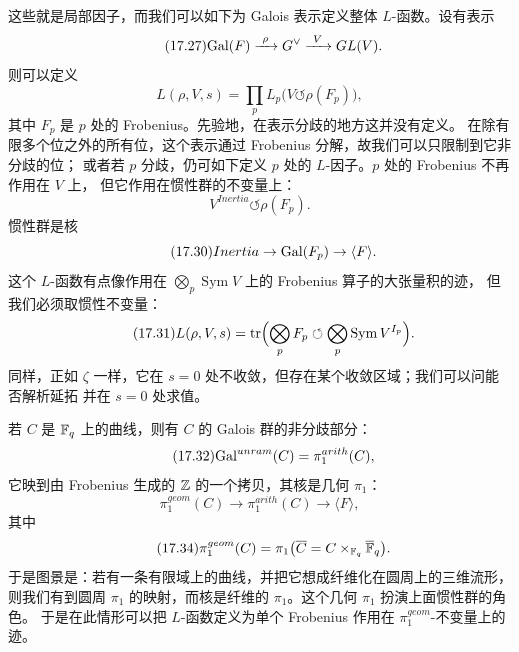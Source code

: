 这些就是局部因子，而我们可以如下为 Galois 表示定义整体 $L$-函数。设有表示
\begin{equation}\tag{17.27}\label{eq:17.27}
\mathrm{Gal}(F)\xrightarrow{\ \rho\ }G^{\vee}\xrightarrow{\ V\ }GL(V).
\end{equation}
则可以定义
\begin{equation}\tag{17.28}\label{eq:17.28}
L(\rho,V,s)=\prod_p L_p\bigl(V\circlearrowleft\rho(F_p)\bigr),
\end{equation}
其中 $F_p$ 是 $p$ 处的 Frobenius。先验地，在表示分歧的地方这并没有定义。
在除有限多个位之外的所有位，这个表示通过 Frobenius 分解，故我们可以只限制到它非分歧的位；
或者若 $p$ 分歧，仍可如下定义 $p$ 处的 $L$-因子。$p$ 处的 Frobenius 不再作用在 $V$ 上，
但它作用在惯性群的不变量上：
\begin{equation}\tag{17.29}\label{eq:17.29}
V^{Inertia}\circlearrowleft\rho(F_p).
\end{equation}
惯性群是核
\begin{equation}\tag{17.30}\label{eq:17.30}
Inertia\to\mathrm{Gal}(F_p)\to\langle F\rangle.
\end{equation}
这个 $L$-函数有点像作用在 $\bigotimes_p\operatorname{Sym}V$ 上的 Frobenius 算子的大张量积的迹，
但我们必须取惯性不变量：
\begin{equation}\tag{17.31}\label{eq:17.31}
L(\rho,V,s)=\operatorname{tr}\Bigl(\bigotimes_p F_p\circlearrowleft
\bigotimes_p\operatorname{Sym}V^{I_p}\Bigr).
\end{equation}
同样，正如 $\zeta$ 一样，它在 $s=0$ 处不收敛，但存在某个收敛区域；我们可以问能否解析延拓
并在 $s=0$ 处求值。

若 $C$ 是 $\mathbb{F}_q$ 上的曲线，则有 $C$ 的 Galois 群的非分歧部分：
\begin{equation}\tag{17.32}\label{eq:17.32}
\mathrm{Gal}^{unram}(C)=\pi_1^{arith}(C),
\end{equation}
它映到由 Frobenius 生成的 $\mathbb{Z}$ 的一个拷贝，其核是几何 $\pi_1$：
\begin{equation}\tag{17.33}\label{eq:17.33}
\pi_1^{geom}(C)\to\pi_1^{arith}(C)\to\langle F\rangle,
\end{equation}
其中
\begin{equation}\tag{17.34}\label{eq:17.34}
\pi_1^{geom}(C)=\pi_1\bigl(\overline C=C\times_{\mathbb{F}_q}\overline{\mathbb{F}}_q\bigr).
\end{equation}
于是图景是：若有一条有限域上的曲线，并把它想成纤维化在圆周上的三维流形，则我们有到圆周
$\pi_1$ 的映射，而核是纤维的 $\pi_1$。这个几何 $\pi_1$ 扮演上面惯性群的角色。
于是在此情形可以把 $L$-函数定义为单个 Frobenius 作用在 $\pi_1^{geom}$-不变量上的迹。

